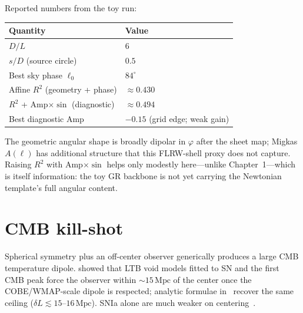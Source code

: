 \documentclass[11pt,a4paper]{article}
\begin{document}
Reported numbers from the toy run:
\begin{center}
\begin{tabular}{@{}ll@{}}
\toprule
Quantity & Value \\
\midrule
$D/L$ & $6$ \\
$s/D$ (source circle) & $0.5$ \\
Best sky phase $\ell_0$ & $84^\circ$ \\
Affine $R^2$ (geometry + phase) & $\approx0.430$ \\
$R^2$ + Amp$\times\sin$ (diagnostic) & $\approx0.494$ \\
Best diagnostic Amp & $-0.15$ (grid edge; weak gain) \\
\bottomrule
\end{tabular}
\end{center}

The geometric angular shape is broadly dipolar in $\varphi$ after the sheet
map; Migkas $A(\ell)$ has additional structure that this FLRW-shell proxy does
not capture. Raising $R^2$ with Amp$\times\sin$ helps only modestly here---unlike
Chapter~1---which is itself information: the toy GR backbone is not yet carrying
the Newtonian template's full angular content.

\section{CMB kill-shot}
\label{sec:cmb}

Spherical symmetry plus an off-center observer generically produces a large CMB
temperature dipole. \citet{Alnes2006} showed that LTB void models fitted to SN
and the first CMB peak force the observer within $\sim15\,\mathrm{Mpc}$ of the
center once the COBE/WMAP-scale dipole is respected; analytic formulae
in~\citet{Saito2010,Kodama2010} recover the same ceiling
($\delta L\lesssim15$--$16\,\mathrm{Mpc}$). SNIa alone are much weaker on
centering~\citep{Alnes2006SN,Blomqvist2010}.
\end{document}
